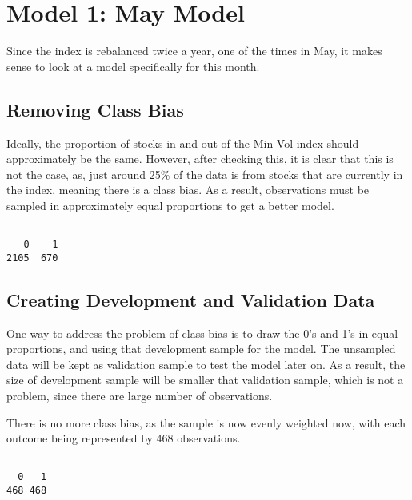 \documentclass[12pt,twoside]{reedthesis}
\newenvironment{Shaded}{\begin{snugshade}}{\end{snugshade}}
\newcommand{\KeywordTok}[1]{\textcolor[rgb]{0.13,0.29,0.53}{\textbf{{#1}}}}
\newcommand{\NormalTok}[1]{{#1}}
\theoremstyle{definition}
\theoremstyle{definition}
\theoremstyle{definition}
\theoremstyle{remark}
\begin{document}
\section{Model 1: May Model}\label{model-1-may-model}

Since the index is rebalanced twice a year, one of the times in May, it
makes sense to look at a model specifically for this month.

\subsection{Removing Class Bias}\label{removing-class-bias}

Ideally, the proportion of stocks in and out of the Min Vol index should
approximately be the same. However, after checking this, it is clear
that this is not the case, as, just around 25\% of the data is from
stocks that are currently in the index, meaning there is a class bias.
As a result, observations must be sampled in approximately equal
proportions to get a better model.
\begin{Shaded}
\end{Shaded}
\begin{verbatim}

   0    1 
2105  670 
\end{verbatim}
\subsection{Creating Development and Validation
Data}\label{creating-development-and-validation-data}

One way to address the problem of class bias is to draw the 0's and 1's
in equal proportions, and using that development sample for the model.
The unsampled data will be kept as validation sample to test the model
later on. As a result, the size of development sample will be smaller
that validation sample, which is not a problem, since there are large
number of observations.

There is no more class bias, as the sample is now evenly weighted now,
with each outcome being represented by 468 observations.
\begin{Shaded}
\end{Shaded}
\begin{verbatim}

  0   1 
468 468 
\end{verbatim}
\end{document}
